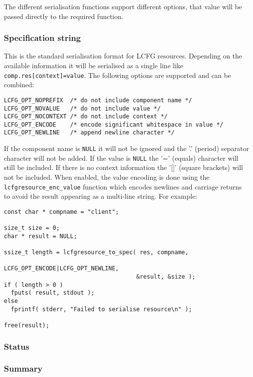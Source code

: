 \documentclass[11pt,a4paper,titlepage]{article}
\begin{document}
The different serialisation functions support different options, that
value will be passed directly to the required function.

\subsubsection{Specification string}

This is the standard serialisation format for LCFG
resources. Depending on the available information it will be
serialised as a single line like \texttt{comp.res[context]=value}. The
following options are supported and can be combined:

\begin{verbatim}
LCFG_OPT_NOPREFIX  /* do not include component name */
LCFG_OPT_NOVALUE   /* do not include value */
LCFG_OPT_NOCONTEXT /* do not include context */
LCFG_OPT_ENCODE    /* encode significant whitespace in value */
LCFG_OPT_NEWLINE   /* append newline character */
\end{verbatim}

If the component name is \texttt{NULL} it will not be ignored and the
'.'  (period) separator character will not be added. If the value is
\texttt{NULL} the '=' (equals) character will still be included. If
there is no context information the '[]' (square brackets) will not be
included. When enabled, the value encoding is done using the
\texttt{lcfgresource\_enc\_value} function which encodes newlines and
carriage returns to avoid the result appearing as a multi-line
string. For example:

\begin{verbatim}
const char * compname = "client";

size_t size = 0;
char * result = NULL;

ssize_t length = lcfgresource_to_spec( res, compname,
                                      LCFG_OPT_ENCODE|LCFG_OPT_NEWLINE,
                                      &result, &size );
if ( length > 0 )
  fputs( result, stdout );
else
  fprintf( stderr, "Failed to serialise resource\n" );

free(result);
\end{verbatim}

\subsubsection{Status}

\subsubsection{Summary}
\end{document}
